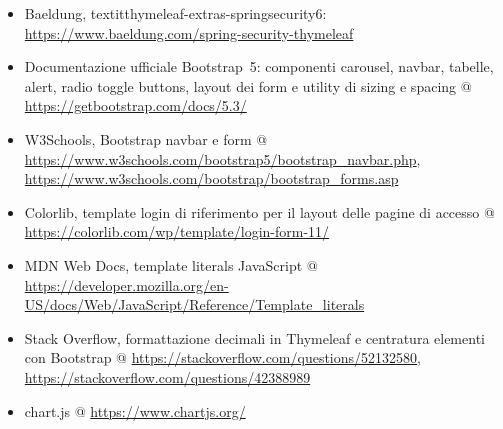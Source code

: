 \begin{itemize}
  \item Baeldung, textit{thymeleaf-extras-springsecurity6}:
    \url{https://www.baeldung.com/spring-security-thymeleaf}

  \item Documentazione ufficiale Bootstrap~5: componenti carousel, navbar,
    tabelle, alert, radio toggle buttons, layout dei form e utility di
    sizing e spacing @
    \url{https://getbootstrap.com/docs/5.3/}

  \item W3Schools, Bootstrap navbar e form @
    \url{https://www.w3schools.com/bootstrap5/bootstrap_navbar.php},
    \url{https://www.w3schools.com/bootstrap/bootstrap_forms.asp}

  \item Colorlib, template login di riferimento per il layout delle
    pagine di accesso @
    \url{https://colorlib.com/wp/template/login-form-11/}

  \item MDN Web Docs, template literals JavaScript @
    \url{https://developer.mozilla.org/en-US/docs/Web/JavaScript/Reference/Template_literals}

  \item Stack Overflow, formattazione decimali in Thymeleaf e
    centratura elementi con Bootstrap @
    \url{https://stackoverflow.com/questions/52132580},
    \url{https://stackoverflow.com/questions/42388989}

  \item chart.js @ \url{https://www.chartjs.org/}
\end{itemize}